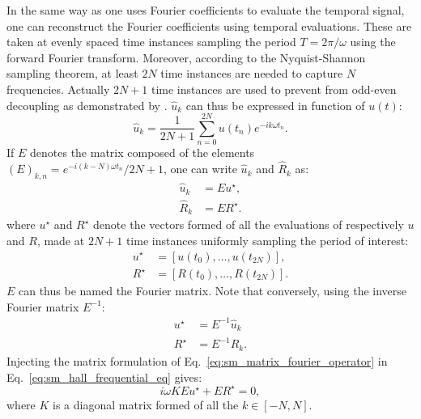 In the same way as one uses Fourier coefficients to
evaluate the temporal signal,
one can reconstruct the Fourier coefficients using
temporal evaluations. These are taken at evenly spaced time instances
sampling the period $T = 2 \pi / \omega$ using the forward
Fourier transform. Moreover, 
according to the Nyquist-Shannon~\cite{Shannon1949} sampling theorem, 
at least $2N$ time instances are needed to capture $N$ frequencies. Actually
$2N+1$ time instances are used to prevent from odd-even decoupling as
demonstrated by \citet{Weide2005}. $\widehat{u}_k$ can thus
be expressed in function of $u(t)$:
\begin{equation}
	\widehat{u}_k = \frac{1}{2N+1} 
	\sum_{n=0}^{2N} u(t_n) e^{-i k \omega t_n}.
\end{equation}
If $E$ denotes the matrix composed of the elements 
$(E)_{k,n} = e^{-i (k - N) \omega t_n} / 2N+1$, one can write $\widehat{u}_k$
and $\widehat{R}_k$ as:
\begin{equation}
	\begin{split}
		\widehat{u}_k &= E u^\star, \\
		\widehat{R}_k &= E R^\star.
	\end{split}
	\label{eq:sm_matrix_fourier_operator}
\end{equation}
where $u^\star$ and $R^\star$ 
denote the vectors formed of all the evaluations of respectively $u$
and $R$,
made at $2N+1$ time instances uniformly sampling the period of interest:
\begin{equation}
	\begin{split}
		u^\star &= [u(t_0), \ldots, u(t_{2N})], \\
		R^\star &= [R(t_0), \ldots, R(t_{2N})].
	\end{split}
\end{equation}
$E$ can thus be named the Fourier matrix.
Note that conversely, using the inverse Fourier matrix $E^{-1}$:
\begin{equation}
	\begin{split}
		u^\star &= E^{-1} \widehat{u}_k \\
		R^\star &= E^{-1} \widehat{R}_k.
	\end{split}
	\label{eq:sm_sampling_hb_var}
\end{equation}
Injecting the matrix formulation of 
Eq.~\eqref{eq:sm_matrix_fourier_operator} in 
Eq.~\eqref{eq:sm_hall_frequential_eq}
gives:
\begin{equation}
	i \omega K E u^\star + E R^\star = 0,
\end{equation}
where $K$ is a diagonal matrix formed of all the $k \in [-N, N]$.
